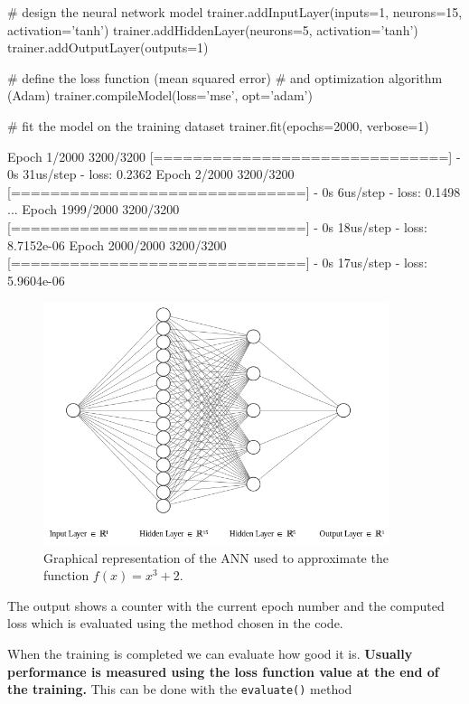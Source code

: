 \begin{ipython}
# design the neural network model
trainer.addInputLayer(inputs=1, neurons=15, activation='tanh')
trainer.addHiddenLayer(neurons=5, activation='tanh')
trainer.addOutputLayer(outputs=1)

# define the loss function (mean squared error)
# and optimization algorithm (Adam)
trainer.compileModel(loss='mse', opt='adam')

# fit the model on the training dataset
trainer.fit(epochs=2000, verbose=1)
\end{ipython}
\begin{ioutput}
Epoch 1/2000
3200/3200 [==============================] - 0s 31us/step - loss: 0.2362
Epoch 2/2000
3200/3200 [==============================] - 0s 6us/step - loss: 0.1498
...
Epoch 1999/2000
3200/3200 [==============================] - 0s 18us/step - loss: 8.7152e-06
Epoch 2000/2000
3200/3200 [==============================] - 0s 17us/step - loss: 5.9604e-06
\end{ioutput}

\begin{figure}[htb]
\centering
\includegraphics[width=0.9\textwidth]{figures/ann_1.png}
\caption{Graphical representation of the ANN used to approximate the function $f(x) = x^3 + 2$.}
\label{fig:ann_1}
\end{figure}

The output shows a counter with the current epoch number and the computed loss which is evaluated using the method chosen in the code.

When the training is completed we can evaluate how good it is. \textbf{Usually performance is measured using the loss function value at the end of the training.}
This can be done with the \texttt{evaluate()} method

